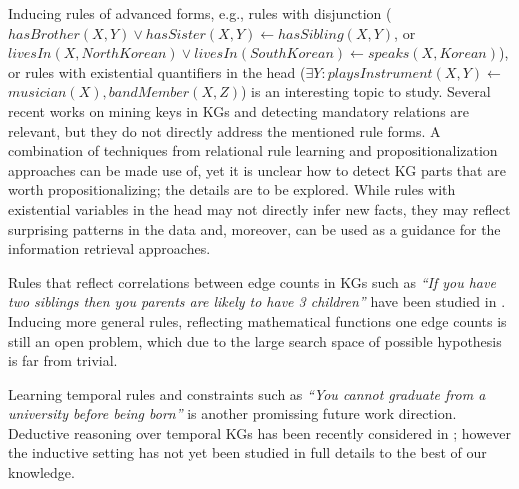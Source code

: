 Inducing rules of  advanced forms, e.g., %
rules with disjunction (\eg $hasBrother(X,Y) \vee hasSister(X,Y) \leftarrow hasSibling(X,Y)$, or $livesIn(X, North Korean) \vee livesIn(South Korean) \leftarrow speaks(X, Korean) $), or rules with existential quantifiers in the head (\eg $\exists Y: playsInstrument(X, Y) \leftarrow$ $musician(X),bandMember(X,Z)$) is an interesting topic to study. Several recent works on mining keys in KGs \cite{vickey,DBLP:conf/www/LajusS18} and detecting mandatory relations are relevant, but they do not directly address the mentioned rule forms. A combination of techniques from relational rule learning \cite{DBLP:books/daglib/0021868} and propositionalization approaches \cite{propos} can be made use of, yet it is unclear how to detect KG parts that are worth propositionalizing; the details are to be explored. %
While rules with existential variables in the head may not directly infer new facts, they may reflect surprising patterns in the data and, moreover,  can be used as a guidance for the information retrieval approaches.

Rules that reflect correlations between edge counts in KGs such as \emph{``If you have two siblings then you parents are likely to have 3 children''} have been studied in \cite{carl}. Inducing more general rules, reflecting mathematical functions one edge counts is still an open problem, which due to the large search space of possible hypothesis is far from trivial.

Learning temporal rules and constraints such as \emph{``You cannot graduate from a university before being born''} is another promissing future work direction. Deductive reasoning over temporal KGs has been recently considered in \cite{DBLP:conf/aaai/ChekolPSS17}; however the inductive setting has not yet been studied in full details to the best of our knowledge.

